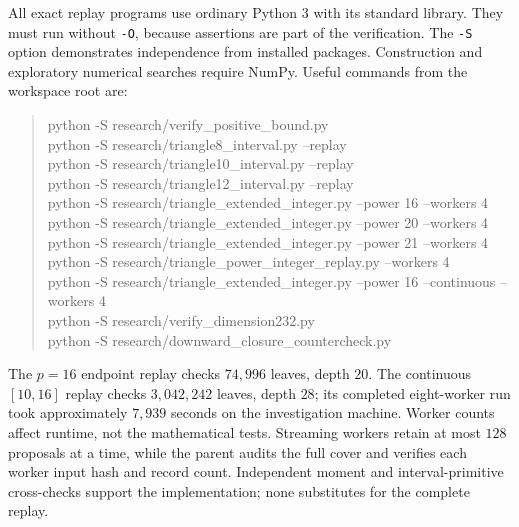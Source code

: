 \documentclass[11pt]{article}
\theoremstyle{definition}
\begin{document}
All exact replay programs use ordinary Python 3 with its standard library.
They must run without \texttt{-O}, because assertions are part of the
verification. The \texttt{-S} option demonstrates independence from installed
packages. Construction and exploratory numerical searches require NumPy.
Useful commands from the workspace root are:
\begin{quote}\footnotesize\ttfamily
python -S research/verify\_positive\_bound.py\\
python -S research/triangle8\_interval.py --replay\\
python -S research/triangle10\_interval.py --replay\\
python -S research/triangle12\_interval.py --replay\\
python -S research/triangle\_extended\_integer.py --power 16 --workers 4\\
python -S research/triangle\_extended\_integer.py --power 20 --workers 4\\
python -S research/triangle\_extended\_integer.py --power 21 --workers 4\\
python -S research/triangle\_power\_integer\_replay.py --workers 4\\
python -S research/triangle\_extended\_integer.py --power 16 --continuous --workers 4\\
python -S research/verify\_dimension232.py\\
python -S research/downward\_closure\_countercheck.py
\end{quote}
The $p=16$ endpoint replay checks $74{,}996$ leaves, depth $20$.
The continuous $[10,16]$ replay checks $3{,}042{,}242$ leaves, depth $28$;
its completed eight-worker run took approximately $7{,}939$ seconds on the
investigation machine. Worker counts affect runtime, not the mathematical
tests. Streaming workers retain at most $128$ proposals at a time, while
the parent audits the full cover and verifies each worker input hash and
record count. Independent moment and interval-primitive cross-checks
support the implementation; none substitutes for the complete replay.
\end{document}
